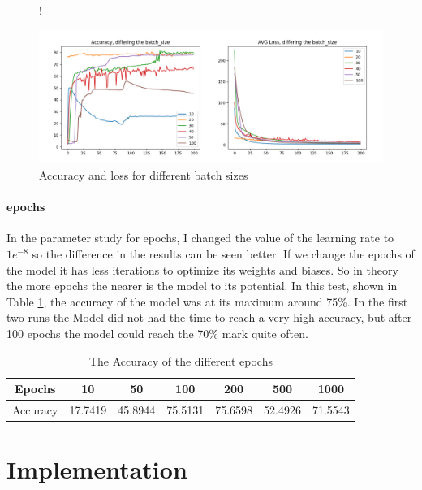 \documentclass[a4paper, 12pt, oneside]{scrbook}
\begin{document}
					\begin{figure} [H]
						\centering
						\resizebox{\linewidth} {!} {
							\includegraphics{res/parameter_study/batch_ps.png}
							
						}
						\caption{Accuracy and loss for different batch sizes}
						\label{fig:parameter_study_batch}
					\end{figure}
					
					
				\subsubsection{epochs}
					In the parameter study for epochs, I changed the value of the learning rate to $1e^{-8}$ so the difference in the results can be seen better. If we change the epochs of the model it has less iterations to optimize its weights and biases. So in theory the more epochs the nearer is the model to its potential. In this test, shown in Table \ref{tab:parameter_study}, the accuracy of the model was at its maximum around 75\%. In the first two runs the Model did not had the time to reach a very high accuracy, but after 100 epochs the model could reach the 70\% mark quite often. 
				\begin{table}[!h]
					\begin{center}
						\begin{tabular}{| c || c | c | c | c  | c | c | }
							\hline
							Epochs & 10 & 50  & 100 & 200 & 500 & 1000 \\
							\hline
							Accuracy & 17.7419  & 45.8944 & 75.5131 & 75.6598 & 52.4926 & 71.5543 \\ 
							\hline
						\end{tabular}
						\caption{\label{tab:parameter_study}The Accuracy of the different epochs}
					\end{center}
				\end{table}	
	 
	\chapter{Implementation}
		
\end{document}
